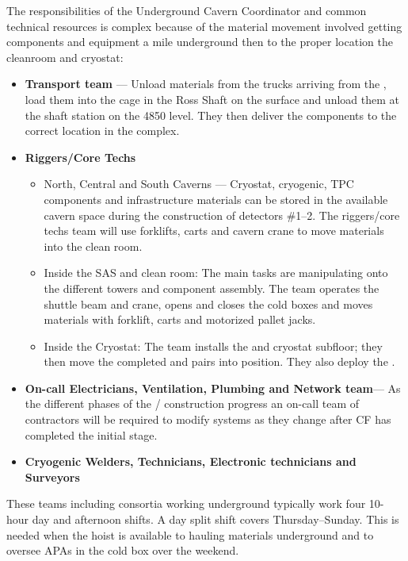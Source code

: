The responsibilities of the Underground Cavern Coordinator and common
technical resources is complex because of the material movement
involved getting components and equipment a mile underground then to
the proper location the cleanroom and cryostat:
\begin{itemize}
  \item {\bf Transport team} --- Unload materials from the trucks arriving
    from the , load them into the cage in the Ross Shaft on the
    surface and unload them at the shaft station on the 4850 level.
    They then deliver the components to the correct location in the
     complex.
  \item {\bf {} Riggers/Core Techs}
    \begin{itemize}
      \item North, Central and South Caverns --- Cryostat, cryogenic,
        TPC components and infrastructure materials can be stored in
        the available cavern space during the construction of
        detectors \#1--2.  The  riggers/core techs team will use
        forklifts, carts and cavern crane to move materials into the
        clean room.
      \item Inside the SAS and clean room: The main tasks are
        manipulating  onto the different 
        towers and  component assembly. The team operates
        the shuttle beam and crane, opens and closes the cold boxes
        and moves materials with forklift, carts and motorized pallet
        jacks.
      \item Inside the Cryostat: The  team installs the
         and cryostat subfloor; they then move the
        completed  and  pairs into
        position. They also deploy the .
    \end{itemize}
  \item {\bf On-call Electricians, Ventilation, Plumbing and Network
    team}--- As the different phases of the /
    construction progress an on-call team of contractors will be
    required to modify systems as they change after CF has completed
    the initial stage.
   \item {\bf Cryogenic Welders, Technicians, Electronic technicians and Surveyors}
\end{itemize}

These teams including consortia working underground typically work
four 10-hour day and afternoon shifts.  A day split shift covers
Thursday--Sunday. This is needed when the hoist is available to hauling
materials underground and to oversee APAs in the cold box over the
weekend.

